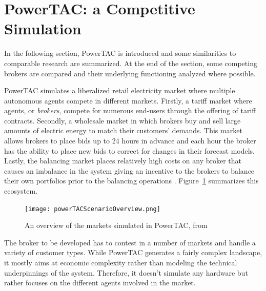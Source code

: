 \section{PowerTAC: a Competitive Simulation}%
\label{sec:powertac_a_competitive_simulation}


In the following section, \acl{PowerTAC} is introduced and some similarities to comparable
research are summarized. At the end of the section, some competing brokers are compared and their underlying
functioning analyzed where possible.

\ac{PowerTAC} simulates a liberalized retail electricity market where multiple autonomous agents compete in
different markets. Firstly, a tariff market where agents, or \emph{brokers}, compete for numerous end-users through the
offering of tariff contracts. Secondly, a wholesale market in which brokers buy and sell large amounts of electric
energy to match their customers' demands. This market allows brokers to place bids up to 24 hours in advance and each
hour the broker has the ability to place new bids to correct for changes in their forecast models. Lastly, the balancing
market places relatively high costs on any broker that causes an imbalance in the system giving an incentive to the
brokers to balance their own portfolios prior to the balancing operations \citep{ketter2018powertac}. Figure~\ref{fig:powertacoverview} summarizes
this ecosystem.

\begin{figure}[h]%
    \texttt{[image: powerTACScenarioOverview.png]}
    \caption{An overview of the markets simulated in PowerTAC, from \citep{ketter2018powertac} }
    \label{fig:powertacoverview}
\end{figure}


The broker to be developed has to contest in a number of markets and handle a variety of customer types. While
\ac{PowerTAC} generates a fairly complex landscape, it mostly aims at economic complexity rather than
modeling the technical underpinnings of the system. Therefore, it doesn't simulate any hardware but rather focuses on the
different agents involved in the market.

